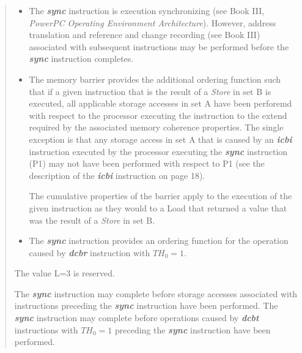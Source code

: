 \documentclass[10pt]{article}
\def\sync{\mbox{\bf\em sync}}
\def\icbi{\mbox{\bf\em icbi}}
\def\dcbt{\mbox{\bf\em dcbt}}
\begin{document}
\begin{quotation}
\begin{itemize}
  \item The {\sync} instruction is execution synchronizing (see
   Book III, {\em PowerPC Operating Environment
   Architecture}). However, address translation and reference and
   change recording (see Book III) associated with subsequent
   instructions may be performed before the {\sync} instruction
   completes.

 \item The memory barrier provides the additional ordering function
   such that if a given instruction that is the result of a {\em Store}
   in set B is executed, all applicable storage accesses in set A have
   been perforemd with respect to the processor executing the instruction
   to the extend required by the associated memory coherence
   properties. The single exception is that any storage access in set A
   that is caused by an {\icbi} instruction executed by the processor
   executing the {\sync} instruction (P1) may not have been performed
   with respect to P1 (see the description of the {\icbi} instruction on
   page 18).

   The cumulative properties of the barrier apply to the execution of the
   given instruction as they would to a Load that returned a value that
   was the result of a {\em Store} in set B.

 \item The {\sync} instruction provides an ordering function for
   the operation caused by {\em\bf dcbr} instruction with $TH_0=1$.
\end{itemize}

The value L=3 is reserved.

The \sync{} instruction may complete before storage accesses
associated with instructions preceding the \sync{} instruction have
been performed. The \sync{} instruction may complete before operations
caused by \dcbt{} instructions with $TH_0 = 1$ preceding the \sync{}
instruction have been performed.  
\end{quotation}
\end{document}
